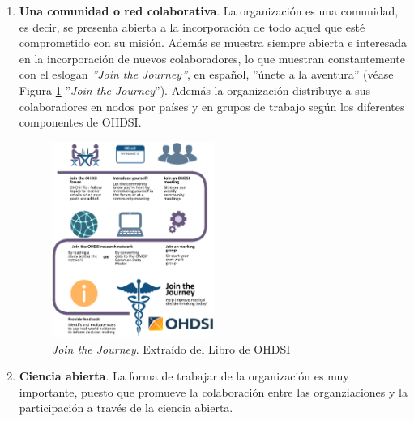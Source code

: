 \begin{enumerate}[label=\roman*.]
    \item \textbf{Una comunidad o red colaborativa}. La organización es una comunidad, es decir, se presenta abierta a la incorporación de todo aquel que esté comprometido con su misión. Además se muestra siempre abierta e interesada en la incorporación de nuevos colaboradores, lo que muestran constantemente con el eslogan \textit{''Join the Journey''}, en español, ''únete a la aventura'' (véase Figura \ref{fig:joinTheJourney} ''\textit{Join the Journey}''). Además la organización distribuye a sus colaboradores en nodos por países y en grupos de trabajo según los diferentes componentes de OHDSI. 
    
\begin{figure}[H]
    \centering
    \includegraphics[width=0.50\textwidth]{figures/joinTheJourney.png}
     \caption{\textit{Join the Journey}. Extraído del Libro de OHDSI \cite{OHDSIbook}}
    \label{fig:joinTheJourney}
\end{figure}
    

    \item \textbf{Ciencia abierta}. La forma de trabajar de la organización es muy importante, puesto que promueve la colaboración entre las organziaciones y la participación a través de la ciencia abierta.


\end{enumerate}
